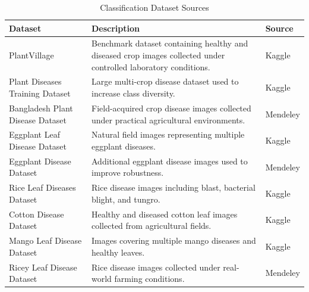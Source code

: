 \begin{table}[H]
\centering
\caption{Classification Dataset Sources}
\label{tab:classification_datasets}
\renewcommand{\arraystretch}{1.35}
\begin{tabularx}{\textwidth}{>{\raggedright\arraybackslash}p{4.4cm}X>{\raggedright\arraybackslash}p{2.2cm}}
\toprule
\textbf{Dataset} & \textbf{Description} & \textbf{Source}\\
\midrule

PlantVillage~\cite{dataset_plantvillage_kaggle} &
Benchmark dataset containing healthy and diseased crop images collected under controlled laboratory conditions. &
Kaggle\\

Plant Diseases Training Dataset~\cite{dataset_plant_diseases_training} &
Large multi-crop disease dataset used to increase class diversity. &
Kaggle\\

Bangladesh Plant Disease Dataset~\cite{dataset_bangladesh_plant_disease} &
Field-acquired crop disease images collected under practical agricultural environments. &
Mendeley\\

Eggplant Leaf Disease Dataset~\cite{dataset_eggplant_leaf_kaggle} &
Natural field images representing multiple eggplant diseases. &
Kaggle\\

Eggplant Disease Dataset~\cite{dataset_eggplant_mendeley} &
Additional eggplant disease images used to improve robustness. &
Mendeley\\

Rice Leaf Diseases Dataset~\cite{dataset_rice_leaf_kaggle} &
Rice disease images including blast, bacterial blight, and tungro. &
Kaggle\\

Cotton Disease Dataset~\cite{dataset_cotton_kaggle} &
Healthy and diseased cotton leaf images collected from agricultural fields. &
Kaggle\\

Mango Leaf Disease Dataset~\cite{dataset_mango_kaggle} &
Images covering multiple mango diseases and healthy leaves. &
Kaggle\\

Ricey Leaf Disease Dataset~\cite{dataset_ricey_mendeley} &
Rice disease images collected under real-world farming conditions. &
Mendeley\\

\bottomrule
\end{tabularx}
\end{table}

